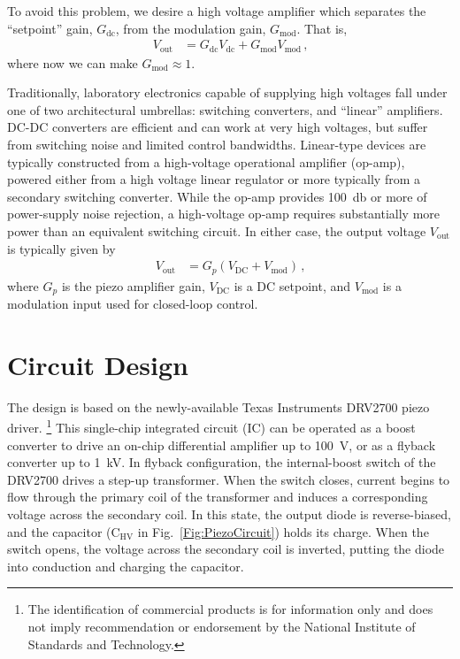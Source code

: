 \documentclass[aip,rsi,reprint]{revtex4-1} %
\begin{document}
To avoid this problem, we desire a high voltage amplifier which separates the ``setpoint'' gain, $G_{\text{dc}}$, from the modulation gain, $G_{\text{mod}}$. That is,
\begin{align}
  V_{\text{out}} &= G_{\text{dc}} V_{\text{dc}} + G_{\text{mod}} V_{\text{mod}}\, \text{,}
  \label{Eq:PiezoTransfer}
\end{align}
where now we can make $G_{\text{mod}} \approx 1$.

Traditionally, laboratory electronics capable of supplying high voltages fall under one of two architectural umbrellas: switching converters, and ``linear'' amplifiers.
DC-DC converters are efficient and can work at very high voltages, but suffer from switching noise and limited control bandwidths.
Linear-type devices are typically constructed from a high-voltage operational amplifier (op-amp), powered either from a high voltage linear regulator or more typically from a secondary switching converter.
While the op-amp provides \SI{100}{\decibel} or more of power-supply noise rejection, a high-voltage op-amp requires substantially more power than an equivalent switching circuit.
In either case, the output voltage  $V_{\text{out}}$ is typically given by
\begin{align}
  V_{\text{out}} &= G_p(V_{\text{DC}} + V_{\text{mod}})\, \text{,}
\end{align}
where $G_p$ is the piezo amplifier gain, $V_{\text{DC}}$ is a DC setpoint, and $V_{\text{mod}}$ is a modulation input used for closed-loop control.

\section{Circuit Design}
\label{Sec:Circuit}

The design is based on the newly-available Texas Instruments DRV2700 piezo driver.
\footnote{The identification of commercial products is for information only and does not imply recommendation or endorsement by the National Institute of Standards and Technology.}
This single-chip integrated circuit (IC) can be operated as a boost converter to drive an on-chip differential amplifier up to \SI{100}{\volt}, or as a flyback converter up to \SI{1}{\kilo\volt}.
In flyback configuration, the internal-boost switch of the DRV2700 drives a step-up transformer.
When the switch closes, current begins to flow through the primary coil of the transformer and induces a corresponding voltage across the secondary coil.
In this state, the output diode is reverse-biased, and the capacitor ($\text{C}_{\text{HV}}$ in Fig.~\ref{Fig:PiezoCircuit}) holds its charge.
When the switch opens, the voltage across the secondary coil is inverted, putting the diode into conduction and charging the capacitor.
\end{document}
